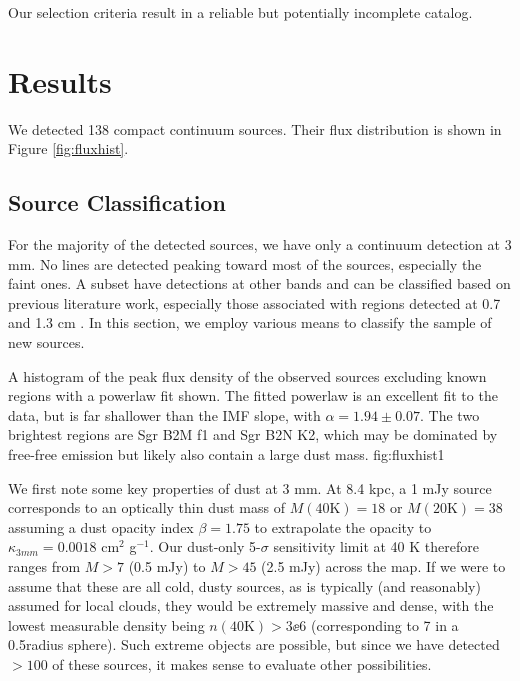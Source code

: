 \documentclass{emulateapj}
\newcommand{\ncores}{138\xspace}
\begin{document}
Our selection criteria result in a reliable but potentially incomplete catalog.

\section{Results}

We detected \ncores compact continuum sources.  Their flux distribution is
shown in Figure \ref{fig:fluxhist}.


\subsection{Source Classification}
\label{sec:classification}
For the majority of the detected sources, we have only a continuum detection at
3 mm.  No lines are detected peaking toward most of the sources, especially the
faint ones.  A subset have detections at other bands and can be classified
based on previous literature work, especially those associated with \hii
regions detected at 0.7 and 1.3 cm
\citep{Gaume1995a,Mehringer1995b,de-Pree1996a,Pree2015a}.  In this section, we
employ various means to classify the sample of new sources.

{A histogram of the peak flux density of the observed sources excluding known
\hii regions with a powerlaw fit shown.  The fitted powerlaw is an excellent
fit to the data, but is far shallower than the IMF slope, with
$\alpha=1.94\pm0.07$.  The two brightest regions are Sgr B2M f1 and Sgr B2N K2,
which may be dominated by free-free emission but likely also contain a large
dust mass.}
{fig:fluxhist}{1}{\textwidth}

We first note some key properties of dust at 3 mm.   At 8.4 kpc, a 1 mJy source
corresponds to an optically thin dust mass of $M(40\mathrm{K})=18$ \msun or
$M(20\mathrm{K})=38$ \msun assuming a dust opacity index $\beta=1.75$ to
extrapolate the \citet{Ossenkopf1994a} opacity to $\kappa_{3mm}=0.0018$ cm$^2$
g$^{-1}$.  Our dust-only 5-$\sigma$ sensitivity limit at 40 K therefore ranges
from $M>7$ \msun (0.5 mJy) to $M>45$ \msun (2.5 mJy) across the map.  If we
were to assume that these are all cold, dusty sources, as is typically (and
reasonably) assumed for local clouds, they would be extremely massive and
dense, with the lowest measurable density being $n(40\mathrm{K}) > 3\ee{6}$
\percc (corresponding to 7 \msun in a 0.5\arcsec radius sphere).  Such extreme
objects are possible, but since we have detected $>100$ of these sources, it
makes sense to evaluate other possibilities.
\end{document}
